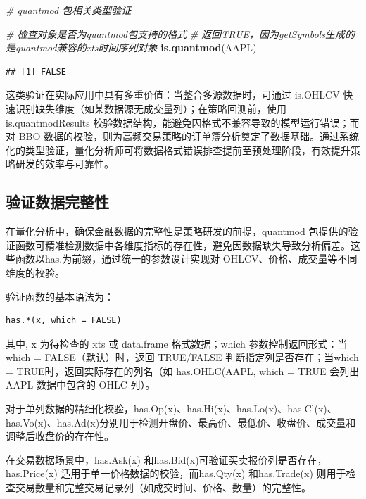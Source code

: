 \documentclass[]{ctexbook}
\newenvironment{Shaded}{\begin{snugshade}}{\end{snugshade}}
\newcommand{\CommentTok}[1]{\textcolor[rgb]{0.56,0.35,0.01}{\textit{#1}}}
\newcommand{\FunctionTok}[1]{\textcolor[rgb]{0.13,0.29,0.53}{\textbf{#1}}}
\newcommand{\NormalTok}[1]{#1}
\begin{document}
\begin{Shaded}
\begin{Highlighting}[]
\CommentTok{\# quantmod 包相关类型验证}

\CommentTok{\# 检查对象是否为quantmod包支持的格式}
\CommentTok{\# 返回TRUE，因为getSymbols生成的是quantmod兼容的xts时间序列对象}
\FunctionTok{is.quantmod}\NormalTok{(AAPL)}
\end{Highlighting}
\end{Shaded}

\begin{verbatim}
## [1] FALSE
\end{verbatim}

这类验证在实际应用中具有多重价值：当整合多源数据时，可通过 is.OHLCV 快速识别缺失维度（如某数据源无成交量列）；在策略回测前，使用 is.quantmodResults 校验数据结构，能避免因格式不兼容导致的模型运行错误；而对 BBO 数据的校验，则为高频交易策略的订单簿分析奠定了数据基础。通过系统化的类型验证，量化分析师可将数据格式错误排查提前至预处理阶段，有效提升策略研发的效率与可靠性。

\subsection{验证数据完整性}\label{ux9a8cux8bc1ux6570ux636eux5b8cux6574ux6027}

在量化分析中，确保金融数据的完整性是策略研发的前提，quantmod 包提供的验证函数可精准检测数据中各维度指标的存在性，避免因数据缺失导致分析偏差。这些函数以has.为前缀，通过统一的参数设计实现对 OHLCV、价格、成交量等不同维度的校验。

验证函数的基本语法为：

\begin{verbatim}
has.*(x, which = FALSE) 
\end{verbatim}

其中, x 为待检查的 xts 或 data.frame 格式数据；which 参数控制返回形式：当 which = FALSE（默认）时，返回 TRUE/FALSE 判断指定列是否存在；当which = TRUE时，返回实际存在的列名（如 has.OHLC(AAPL, which = TRUE 会列出 AAPL 数据中包含的 OHLC 列）。

对于单列数据的精细化校验，has.Op(x)、has.Hi(x)、has.Lo(x)、has.Cl(x)、has.Vo(x)、has.Ad(x)分别用于检测开盘价、最高价、最低价、收盘价、成交量和调整后收盘价的存在性。

在交易数据场景中，has.Ask(x) 和has.Bid(x)可验证买卖报价列是否存在，has.Price(x) 适用于单一价格数据的校验，而has.Qty(x) 和has.Trade(x) 则用于检查交易数量和完整交易记录列（如成交时间、价格、数量）的完整性。
\end{document}

